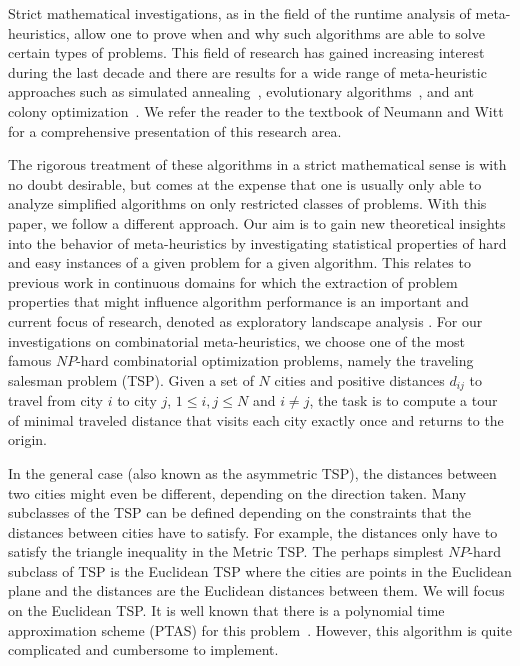 \documentclass{article}
\begin{document}
Strict mathematical investigations, as in the field of the runtime
analysis of meta-heuristics, allow one to prove when and why such
algorithms are able to solve certain types of problems. This field of
research has gained increasing interest during the last decade and
there are results for a wide range of meta-heuristic approaches such as
simulated annealing~\cite{WegenerSimulated}, evolutionary
algorithms~\cite{DJWoneone}, and ant colony
optimization~\cite{NeumannWittAlgorithmica09}. We refer the reader to
the textbook of Neumann and Witt~\cite{BookNeuWit} for a comprehensive
presentation of this research area.

The rigorous treatment of these algorithms in a strict mathematical
sense is with no doubt desirable, but comes at the expense that one is
usually only able to analyze simplified algorithms on only restricted
classes of problems. With this paper, we follow a different
approach. Our aim is to gain new theoretical insights into the
behavior of meta-heuristics by investigating statistical properties
of hard and easy instances of a given problem for a given algorithm.
This relates to previous work in continuous domains for which the extraction of problem properties that might influence algorithm performance is an
important and current focus of research, denoted as exploratory landscape analysis \cite{MBTPWR11,B2012}. For our investigations on combinatorial meta-heuristics, we choose one of the most famous $NP$-hard
combinatorial optimization problems, namely the traveling salesman
problem (TSP). Given a set of $N$ cities and positive distances
$d_{ij}$ to travel from city $i$ to city $j$, $1 \leq i,j \leq N$ and
$i \ne j$, the task is to compute a tour of minimal traveled distance
that visits each city exactly once and returns to the origin.

In the general case (also known as the asymmetric TSP), the distances
between two cities might even be different, depending on the direction
taken.  Many subclasses of the TSP can be defined depending on the
constraints that the distances between cities have to satisfy. For
example, the distances only have to satisfy the triangle inequality in
the Metric TSP.  The perhaps simplest $NP$-hard subclass of TSP is the
Euclidean TSP where the cities are points in the Euclidean plane and
the distances are the Euclidean distances between them. We will focus
on the Euclidean TSP. It is well known that there is a polynomial time
approximation scheme (PTAS) for this problem~\cite{Arora98}. However,
this algorithm is quite complicated and cumbersome to implement.
\end{document}
